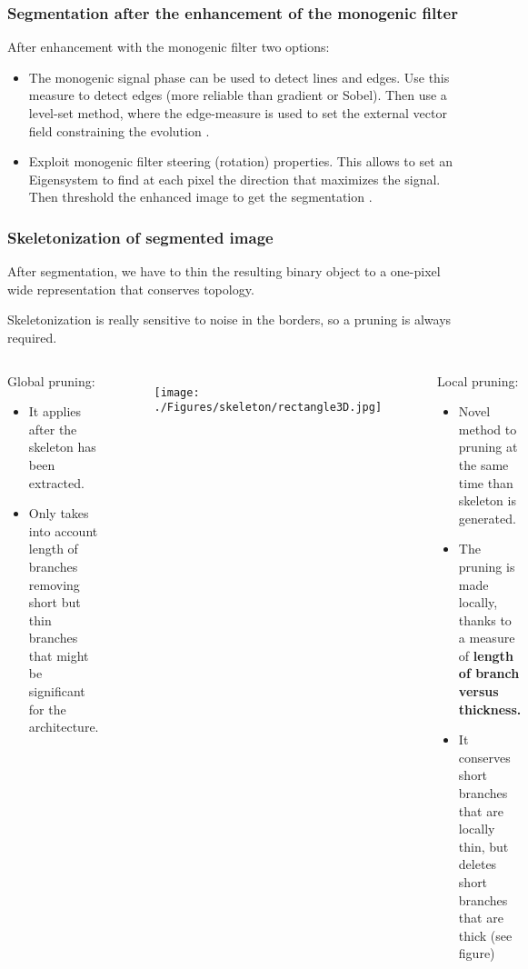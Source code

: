 \documentclass[9pt]{beamer}
\begin{document}
\begin{frame}[t]
  \frametitle{Segmentation after the enhancement of the monogenic filter}
     After enhancement with the monogenic filter two options:
     \begin{itemize}
       \item The monogenic signal phase can be used to detect lines and edges. Use this measure to detect edges (more reliable than gradient or Sobel). Then use a level-set method, where the edge-measure is used to set the external vector field constraining the evolution \citep{rajpoot_local-phase_2009}.
       \item Exploit monogenic filter steering (rotation) properties. This allows to set an Eigensystem to find at each pixel the direction that maximizes the signal. Then threshold the enhanced image to get the segmentation \citep{chenouard_3d_2011}.
     \end{itemize}
\end{frame}

\begin{frame}[t]
  \frametitle{Skeletonization of segmented image}
     After segmentation, we have to thin the resulting binary object to a one-pixel wide representation that conserves topology.
     
     Skeletonization is really sensitive to noise in the borders, so a pruning is always required.
     \begin{columns}[T,onlytextwidth]
       \begin{exampleblock}{Global pruning:}
         \begin{itemize}
           \item It applies after the skeleton has been extracted.
           \item Only takes into account length of branches removing short but thin branches that might be significant for the architecture.
         \end{itemize}
       \end{exampleblock}
       \begin{figure}[h]
       \texttt{[image: ./Figures/skeleton/rectangle3D.jpg]}
       \end{figure}
       \begin{exampleblock}{Local pruning:}
         \begin{itemize}
           \item Novel method to pruning at the same time than skeleton is generated.
           \item The pruning is made locally, thanks to a measure of \textbf{length of branch versus thickness.}
           \item It conserves short branches that are locally thin, but deletes short branches that are thick (see figure)
         \end{itemize}
       \end{exampleblock}
     \end{columns}
\end{frame}
\end{document}
